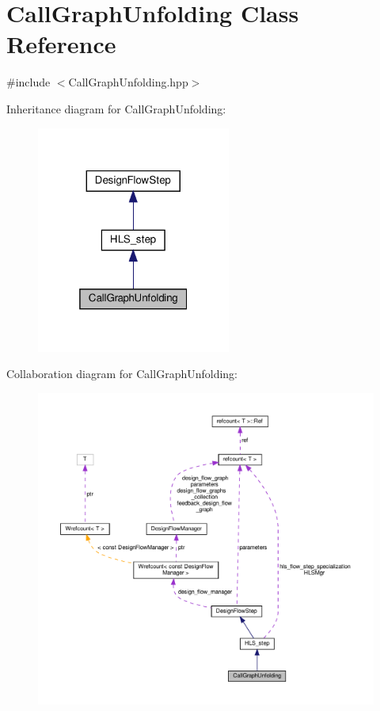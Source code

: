 \hypertarget{classCallGraphUnfolding}{}\section{Call\+Graph\+Unfolding Class Reference}
\label{classCallGraphUnfolding}


{\ttfamily \#include $<$Call\+Graph\+Unfolding.\+hpp$>$}



Inheritance diagram for Call\+Graph\+Unfolding\+:
\nopagebreak
\begin{figure}[H]
\begin{center}
\leavevmode
\includegraphics[width=181pt]{d5/d22/classCallGraphUnfolding__inherit__graph}
\end{center}
\end{figure}


Collaboration diagram for Call\+Graph\+Unfolding\+:
\nopagebreak
\begin{figure}[H]
\begin{center}
\leavevmode
\includegraphics[width=350pt]{d5/d3a/classCallGraphUnfolding__coll__graph}
\end{center}
\end{figure}
